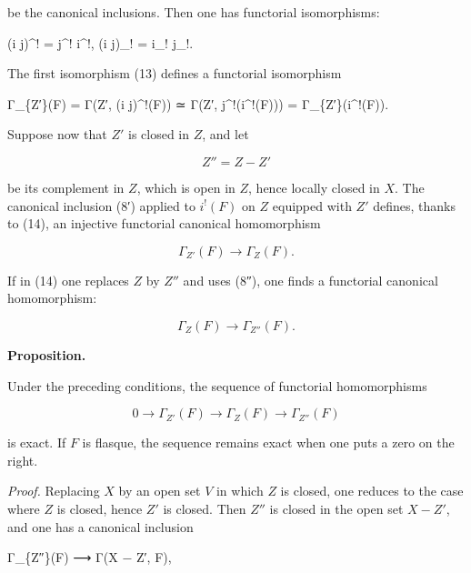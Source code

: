 \documentclass[
]{article}
\newenvironment{Shaded}{}{}
\newcommand{\NormalTok}[1]{#1}
\begin{document}
be the canonical inclusions. Then one has functorial isomorphisms:

\begin{Shaded}
\begin{Highlighting}[]
\NormalTok{(i j)\^{}! = j\^{}! i\^{}!,   (i j)\_! = i\_! j\_!.}
\end{Highlighting}
\end{Shaded}

The first isomorphism (13) defines a functorial isomorphism

\begin{Shaded}
\begin{Highlighting}[]
\NormalTok{Γ\_\{Z′\}(F) = Γ(Z′, (i j)\^{}!(F)) ≃ Γ(Z′, j\^{}!(i\^{}!(F))) = Γ\_\{Z′\}(i\^{}!(F)).}
\end{Highlighting}
\end{Shaded}

Suppose now that \(Z'\) is closed in \(Z\), and let

\[
Z'' = Z - Z'
\]

be its complement in \(Z\), which is open in \(Z\), hence locally closed
in \(X\). The canonical inclusion (8′) applied to \(i^{!}(F)\) on \(Z\)
equipped with \(Z'\) defines, thanks to (14), an injective functorial
canonical homomorphism

\[
\Gamma_{Z'}(F) \longrightarrow \Gamma_{Z}(F).
\]

If in (14) one replaces \(Z\) by \(Z''\) and uses (8″), one finds a
functorial canonical homomorphism:

\[
\Gamma_{Z}(F) \longrightarrow \Gamma_{Z''}(F).
\]

\textbf{Proposition.}

Under the preceding conditions, the sequence of functorial homomorphisms

\[
0 \longrightarrow \Gamma_{Z'}(F) \longrightarrow \Gamma_{Z}(F) \longrightarrow \Gamma_{Z''}(F)
\]

is exact. If \(F\) is flasque, the sequence remains exact when one puts
a zero on the right.

\emph{Proof.} Replacing \(X\) by an open set \(V\) in which \(Z\) is
closed, one reduces to the case where \(Z\) is closed, hence \(Z'\) is
closed. Then \(Z''\) is closed in the open set \(X - Z'\), and one has a
canonical inclusion

\begin{Shaded}
\begin{Highlighting}[]
\NormalTok{Γ\_\{Z″\}(F) ⟶ Γ(X − Z′, F),}
\end{Highlighting}
\end{Shaded}
\end{document}
